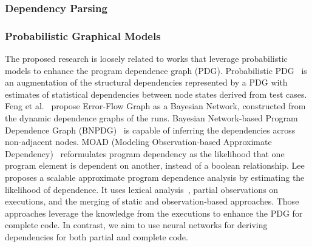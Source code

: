 \subsubsection{Dependency Parsing}


\subsubsection{Probabilistic Graphical Models}
The proposed research is loosely related to works that leverage probabilistic models to enhance the program dependence graph (PDG). Probabilistic PDG~\cite{baah-issta08-probabilistic} is an augmentation of the structural dependencies represented by a PDG with estimates of statistical dependencies between node states derived from test cases. Feng et al.~\cite{feng-paste10} propose Error-Flow Graph as a Bayesian Network, constructed from the dynamic dependence graphs of the runs. Bayesian Network-based Program Dependence Graph (BNPDG)~\cite{yu-jss17-bayesian} is capable of inferring the dependencies across non-adjacent nodes. MOAD (Modeling Observation-based Approximate Dependency)~\cite{lee-scam19-moad} reformulates program dependency as the likelihood that one program element is dependent on another, instead of a boolean relationship.  Lee~\cite{lee-icse20} proposes a scalable approximate program dependence analysis by estimating the likelihood of dependence. It uses lexical analysis~\cite{lee-jss20}, partial observations on executions, and the merging of static and observation-based approaches. Those approaches leverage the knowledge from the executions to enhance the PDG for complete code. In contrast, we aim to use neural networks for deriving dependencies for both partial and complete code.
